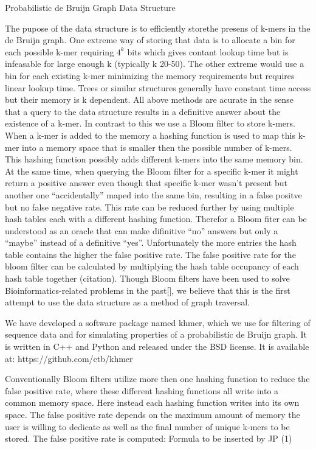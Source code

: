 \documentclass[12pt]{article} \usepackage{simplemargins}
\begin{document}
Probabilistic de Bruijn Graph Data Structure

The pupose of the data structure is to efficiently storethe presens of
k-mers in the de Bruijn graph. One extreme way of storing that data is
to allocate a bin for each possible k-mer requiring $4^k$ bits which
gives contant lookup time but is infeasable for large enough k
(typically k 20-50). The other extreme would use a bin for each
existing k-mer minimizing the memory requirements but requires linear
lookup time. Trees or similar structures generally have constant time
access but their memory is k dependent. All above methods are acurate
in the sense that a query to the data structure results in a
definitive answer about the existence of a k-mer.  In contrast to this
we use a Bloom filter to store k-mers. When a k-mer is added to the
memory a hashing function is used to map this k-mer into a memory
space that is smaller then the possible number of k-mers. This hashing
function possibly adds different k-mers into the same memory bin. At
the same time, when querying the Bloom filter for a specific k-mer it
might return a positive answer even though that specific k-mer wasn’t
present but another one “accidentally” maped into the same bin,
resulting in a false positve but no false negative rate. This rate can
be reduced further by using multiple hash tables each with a different
hashing function. Therefor a Bloom fiter can be understood as an
oracle that can make difinitive “no” answers but only a “maybe”
instead of a definitive “yes”. Unfortunately the more entries the hash
table contains the higher the false positive rate. The false positive
rate for the bloom filter can be calculated by multiplying the hash
table occupancy of each hash table together (citation). Though Bloom
filters have been used to solve Bioinformatics-related problems in the
past[], we believe that this is the first attempt to use the data
structure as a method of graph traversal.

We have developed a software package named khmer, which we use for
filtering of sequence data and for simulating properties of a
probabilistic de Bruijn graph. It is written in C++ and Python and
released under the BSD license. It is available at:
https://github.com/ctb/khmer

Conventionally Bloom filters utilize more then one hashing function to
reduce the false positive rate, where these different hashing
functions all write into a common memory space. Here instead each
hashing function writes into its own space. The false positive rate
depends on the maximum amount of memory the user is willing to
dedicate as well as the final number of unique k-mers to be
stored. The false positive rate is computed:  Formula to be inserted by JP (1)
\end{document}
